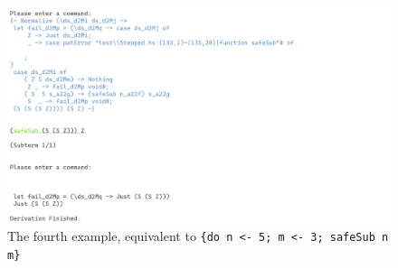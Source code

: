 \begin{figure}
    \includegraphics[width=1\textwidth]{resources/bind_part_3.PNG}
    \caption{The fourth example, equivalent to \texttt{\{do n <- 5; m <- 3; safeSub n m\}}}
\end{figure}
